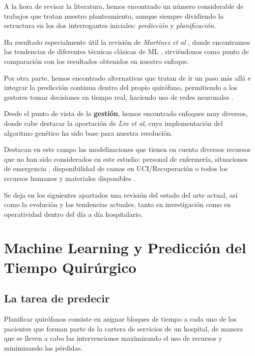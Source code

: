 

A la hora de revisar la literatura, hemos encontrado un número considerable de trabajos que tratan nuestro planteamiento, aunque siempre dividiendo la estructura en los dos interrogantes iniciales: \textit{predicción} y \textit{planificación}.

Ha resultado especialmente útil la revisión de \textit{Martínez et al}\cite{Martinez2021MachinePrediction} , donde encontramos las tendencias de diferentes técnicas clásicas de ML , sirviéndonos como punto de comparación con los resultados obtenidos en nuestro enfoque.

Por otra parte, hemos encontrado alternativas que tratan de ir un paso más allá e integrar la predicción continua dentro del propio quirófano, permitiendo a los gestores tomar decisiones en tiempo real, haciendo uso de redes neuronales \cite{Jiao2022ContinuousNetwork}.

Desde el punto de vista de la \textbf{gestión}, hemos encontrado enfoques muy diversos, donde cabe destacar la aportación de  \textit{Lin et al}\cite{Lin2020AScheduling}, cuya implementación del algoritmo genético ha sido base para nuestra resolución.

Destacan en este campo las modelizaciones que tienen en cuenta diversos recursos que no han sido considerados en este estudio: personal de enfermería\cite{DiMartinelly2014AnScheduling}, situaciones de emergencia \cite{Nouaouri2011OperatingDisaster}, disponibilidad de camas en UCI/Recuperación \cite{Celik2023APrinciple} o todos los recursos humanos y materiales disponibles \cite{Bargetto2023AConstraints}.

Se deja en los siguientes apartados una revisión del estado del arte actual, así como la evolución y las tendencias actuales, tanto en investigación como en operatividad dentro del día a día hospitalario.
\newpage

\section{Machine Learning y Predicción del Tiempo Quirúrgico}

\subsection{La tarea de predecir}

Planificar quirófanos consiste en asignar bloques de tiempo a cada uno de los pacientes que forman parte de la cartera de servicios de un hospital, de manera que se lleven a cabo las intervenciones maximizando el uso de recursos y minimizando las pérdidas.

